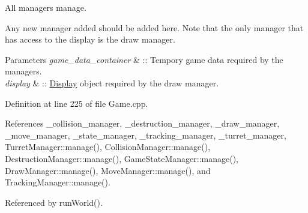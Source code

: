 All managers manage. 

Any new manager added should be added here. Note that the only manager that has access to the display is the draw manager. 
\begin{DoxyParams}{Parameters}
{\em game\-\_\-data\-\_\-container} & \-:\-: Tempory game data required by the managers. \\
\hline
{\em display} & \-:\-: \hyperlink{classDisplay}{Display} object required by the draw manager. \\
\hline
\end{DoxyParams}


Definition at line 225 of file Game.\-cpp.



References \-\_\-collision\-\_\-manager, \-\_\-destruction\-\_\-manager, \-\_\-draw\-\_\-manager, \-\_\-move\-\_\-manager, \-\_\-state\-\_\-manager, \-\_\-tracking\-\_\-manager, \-\_\-turret\-\_\-manager, Turret\-Manager\-::manage(), Collision\-Manager\-::manage(), Destruction\-Manager\-::manage(), Game\-State\-Manager\-::manage(), Draw\-Manager\-::manage(), Move\-Manager\-::manage(), and Tracking\-Manager\-::manage().



Referenced by run\-World().


